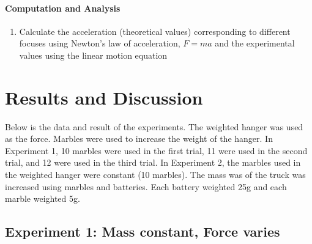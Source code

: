 \documentclass[a4paper,12pt]{article}
\begin{document}
\paragraph{Computation and Analysis}
\begin{enumerate}
    \item Calculate the acceleration (theoretical values) corresponding to different focuses using Newton's law of acceleration, \( F = ma \) and the experimental values using the linear motion equation
\end{enumerate}



\section{Results and Discussion}
Below is the data and result of the experiments. The weighted hanger was used as the force. Marbles were used to increase the weight of the hanger. In Experiment 1, 10 marbles were used in the first trial, 11 were used in the second trial, and 12 were used in the third trial. In Experiment 2, the marbles used in the weighted hanger were constant (10 marbles). The mass was of the truck was increased using marbles and batteries. Each battery weighted 25g and each marble weighted 5g.

\subsection{Experiment 1: Mass constant, Force varies}
\begin{table}[h]
    \centering
    \renewcommand{\arraystretch}{1.2}
    \caption{Results for Experiment 1: Mass constant, Force varies}
    \label{table:exp1}
\end{table}
\end{document}
